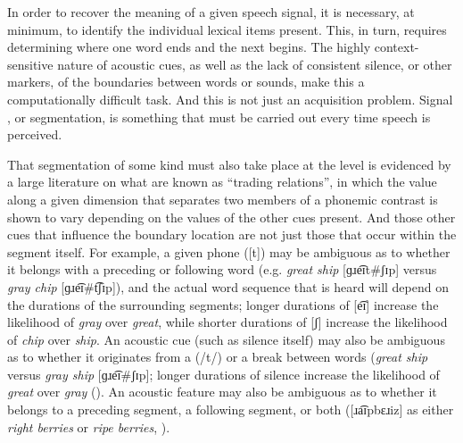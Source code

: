 In order to recover the meaning of a given speech signal, it is necessary,
at minimum, to identify the individual lexical items present. This,
in turn, requires determining where one word ends and the next begins.
The highly context-sensitive nature of acoustic cues, as well as the
lack of consistent silence, or other markers, of the boundaries between
words or sounds, make this a computationally difficult task. And this
is not just an acquisition problem. Signal , or segmentation,
is something that must be carried out every time speech is perceived. 

That segmentation of some kind must also take place at the 
level is evidenced by a large literature on what are known as “trading
relations”, in which the value along a given  dimension
that separates two members of a phonemic contrast is shown to vary
depending on the values of the other  cues present. And those
other cues that influence the boundary location are not just those
that occur within the segment itself. For example, a given phone ({[t]})
may be ambiguous as to whether it belongs with a preceding or following
word (e.g. \textit{great ship} {[}{ɡɹe͡ɪt}\#{ʃɪp}{]}
versus \textit{gray chip} {[}{ɡɹe͡ɪ}\#{t͡ʃɪp}{]}),
and the actual word sequence that is heard will depend on the durations
of the surrounding segments; longer durations of {[e͡ɪ]}
increase the likelihood of \textit{gray} over \textit{great}, while
shorter durations of {[ʃ]} increase the likelihood of \textit{chip}
over \textit{ship}. An acoustic cue (such as silence itself) may also
be ambiguous as to whether it originates from a  ({/t/})
or a break between words (\textit{great ship} versus \textit{gray ship}
{[}{ɡɹe͡ɪ}\#{ʃɪp}{]}; longer durations of silence
increase the likelihood of \textit{great} over \textit{gray} (\citealt{repp1978perceptual}).
An acoustic feature may also be ambiguous as to whether it belongs
to a preceding segment, a following segment, or both ({[}{ɹa͡ɪpbɛɹiz}{]}
as either \textit{right berries} or \textit{ripe berries}, \citealt{Gow2003}). 

